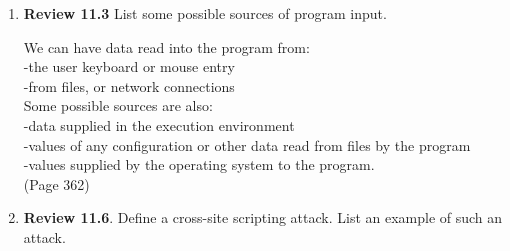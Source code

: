 \documentclass[12pt]{article}
\begin{document}
\begin{enumerate}
\begin{verbatim}
	  int main(int argc, char *argv[ ] )
	  {
	     char buf[16];
	     getinp (buf, sizeof (buf));
	     display(buf);
	     printf("buffer3 done\n");
	  }
		
		\end{verbatim}
	\vspace{10pt}
	
	
	\item {\textbf{Review 11.3} List some possible sources of program input.}
	
	We can have data read into the program from:\\ -the user keyboard or mouse entry \\ -from files, or network connections\\ Some possible sources are also:\\ -data supplied in the execution environment\\ -values of any configuration or other data read from files by the program\\  -values supplied by the operating system to the program. \\ (Page 362)
	
		\vspace{10pt}


	\item {\textbf{Review 11.6}. Define a cross-site scripting attack. List an example of such an attack.}
	

\end{enumerate}
\end{document}
